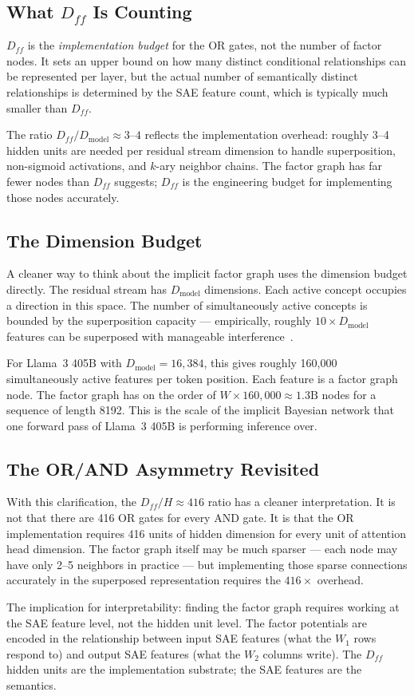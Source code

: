 \subsection*{What $D_{ff}$ Is Counting}

$D_{ff}$ is the \emph{implementation budget} for the OR gates, not the number of
factor nodes. It sets an upper bound on how many distinct conditional relationships
can be represented per layer, but the actual number of semantically distinct
relationships is determined by the SAE feature count, which is typically much
smaller than $D_{ff}$.

The ratio $D_{ff} / D_{\mathrm{model}} \approx 3$--$4$ reflects the implementation
overhead: roughly 3--4 hidden units are needed per residual stream dimension to
handle superposition, non-sigmoid activations, and $k$-ary neighbor chains. The
factor graph has far fewer nodes than $D_{ff}$ suggests; $D_{ff}$ is the engineering
budget for implementing those nodes accurately.

\subsection*{The Dimension Budget}

A cleaner way to think about the implicit factor graph uses the dimension budget
directly. The residual stream has $D_{\mathrm{model}}$ dimensions. Each active
concept occupies a direction in this space. The number of simultaneously active
concepts is bounded by the superposition capacity --- empirically, roughly
$10 \times D_{\mathrm{model}}$ features can be superposed with manageable
interference~\cite{elhage2022superposition}.

For Llama~3 405B with $D_{\mathrm{model}} = 16{,}384$, this gives roughly 160,000
simultaneously active features per token position. Each feature is a factor graph
node. The factor graph has on the order of $W \times 160{,}000 \approx 1.3\mathrm{B}$
nodes for a sequence of length 8192. This is the scale of the implicit Bayesian
network that one forward pass of Llama~3 405B is performing inference over.

\subsection*{The OR/AND Asymmetry Revisited}

With this clarification, the $D_{ff}/H \approx 416$ ratio has a cleaner
interpretation. It is not that there are 416 OR gates for every AND gate. It is
that the OR implementation requires 416 units of hidden dimension for every unit
of attention head dimension. The factor graph itself may be much sparser ---
each node may have only 2--5 neighbors in practice --- but implementing those
sparse connections accurately in the superposed representation requires the
$416\times$ overhead.

The implication for interpretability: finding the factor graph requires working at
the SAE feature level, not the hidden unit level. The factor potentials are encoded
in the relationship between input SAE features (what the $W_1$ rows respond to)
and output SAE features (what the $W_2$ columns write). The $D_{ff}$ hidden units
are the implementation substrate; the SAE features are the semantics.